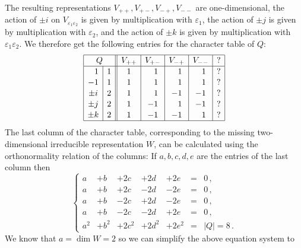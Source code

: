 \begin{example}
  The resulting representations $V_{++}, V_{+-}, V_{-+}, V_{--}$ are one-dimensional, the action of $\pm i$ on $V_{\varepsilon_1 \varepsilon_2}$ is given by multiplication with $\varepsilon_1$, the action of $\pm j$ is given by multiplication with $\varepsilon_2$, and the action of $\pm k$ is given by multiplication with $\varepsilon_1 \varepsilon_2$.
  We therefore get the following entries for the character table of $Q$:
  \[
    \begingroup
    \renewcommand{\arraystretch}{1.1}
    \begin{array}{|c|c||c|c|c|c|c|}
      \hline
        \multicolumn{2}{|c||}{Q}
      & V_{++}
      & V_{+-}
      & V_{-+}
      & V_{--}
      & ?
      \\
      \hline
       \phantom{-}1
      & 1
      &            1
      & \phantom{-}1
      & \phantom{-}1
      & \phantom{-}1
      & ?
      \\
        -1
      & 1
      &            1
      & \phantom{-}1
      & \phantom{-}1
      & \phantom{-}1
      & ?
      \\
        \pm i
      & 2
      &            1
      & \phantom{-}1
      &           -1
      &           -1
      & ?
      \\
        \pm j
      & 2
      &            1
      &           -1
      & \phantom{-}1
      &           -1
      & ?
      \\
        \pm k
      & 2
      &            1
      &           -1
      &           -1
      & \phantom{-}1
      & ?
      \\
      \hline
    \end{array}
    \endgroup
  \]
  The last column of the character table, corresponding to the missing two-dimensional irreducible representation $W$, can be calculated using the orthonormality relation of the columns:
  If $a, b, c, d, e$ are the entries of the last column then
  \[
    \left\{
      \begin{array}{lllllcl}
        a   & + b   & + 2c    & + 2d    & + 2e    &=& 0 \,, \\
        a   & + b   & + 2c    & - 2d    & - 2e    &=& 0 \,, \\
        a   & + b   & - 2c    & + 2d    & - 2e    &=& 0 \,, \\
        a   & + b   & - 2c    & - 2d    & + 2e    &=& 0 \,, \\
        a^2 & + b^2 & + 2c^2  & + 2d^2  & + 2 e^2 &=& |Q| = 8  \,.
      \end{array}
    \right.
  \]
  We know that $a = \dim W = 2$ so we can simplify the above equation system to

\end{example}
